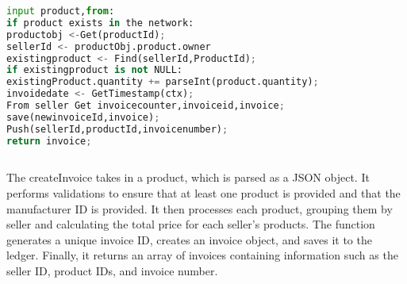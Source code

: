 \begin{lstlisting}[language=Python , caption=invoice creation]
input product,from:
if product exists in the network:
productobj <-Get(productId);
sellerId <- productObj.product.owner
existingproduct <- Find(sellerId,ProductId);
if existingproduct is not NULL:
existingProduct.quantity += parseInt(product.quantity);
invoidedate <- GetTimestamp(ctx);
From seller Get invoicecounter,invoiceid,invoice;
save(newinvoiceId,invoice);
Push(sellerId,productId,invoicenumber);
return invoice;
       
\end{lstlisting}
The createInvoice takes in a product, which is parsed as a JSON object. It performs validations to ensure that at least one product is provided and that the manufacturer ID is provided. It then processes each product, grouping them by seller and calculating the total price for each seller's products. The function generates a unique invoice ID, creates an invoice object, and saves it to the ledger. Finally, it returns an array of invoices containing information such as the seller ID, product IDs, and invoice number.